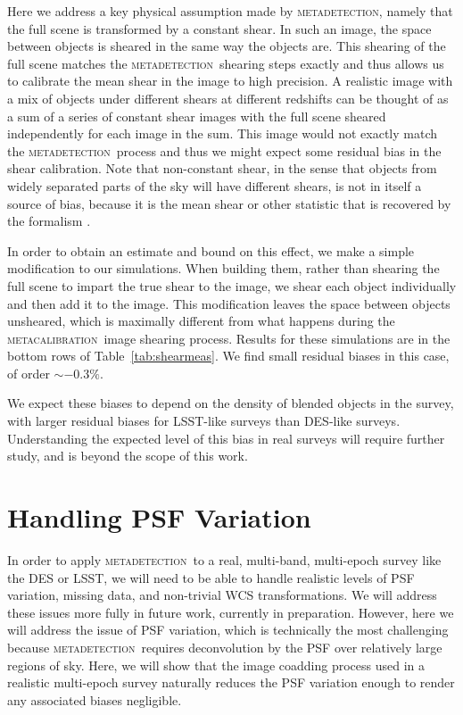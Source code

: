 \documentclass[fleqn,useAMS,usenatbib]{mnras}
\newcommand{\mcal}{\textsc{metacalibration}}
\newcommand{\mdet}{\textsc{metadetection}}
\begin{document}
Here we address a key physical assumption made by \mdet, namely that the full
scene is transformed by a constant shear. In such an image, the space between
objects is sheared in the same way the objects are. This shearing of the full
scene matches the \mdet\ shearing steps exactly and thus allows us to calibrate
the mean shear in the image to high precision. A realistic image with a mix of
objects under different shears at different redshifts can be thought of as a
sum of a series of constant shear images with the full scene sheared
independently for each image in the sum.  This image would not exactly match
the \mdet\ process and thus we might expect some residual bias in the shear
calibration.  Note that non-constant shear, in the sense that objects from
widely separated parts of the sky will have different shears, is not in itself
a source of bias, because it is the mean shear or other statistic that is
recovered by the formalism \citep{SheldonMcal2017}.

In order to obtain an estimate and bound on this effect, we make a simple
modification to our simulations. When building them, rather than shearing the
full scene to impart the true shear to the image, we shear each object
individually and then add it to the image. This modification leaves the space
between objects unsheared, which is maximally different from what happens
during the \mcal\ image shearing process. Results for these simulations are in
the bottom rows of Table~\ref{tab:shearmeas}. We find small residual biases in
this case, of order $\sim-0.3\%$.

We expect these biases to depend on the density of blended objects in the
survey, with larger residual biases for LSST-like surveys than DES-like
surveys.  Understanding the expected level of this bias in real surveys will
require further study, and is beyond the scope of this work.

\section{Handling PSF Variation}
\label{sec:psfvar}

In order to apply \mdet\ to a real, multi-band, multi-epoch survey like the DES
or LSST, we will need to be able to handle realistic levels of PSF variation,
missing data, and non-trivial WCS transformations. We will address these issues
more fully in future work, currently in preparation. However, here we will
address the issue of PSF variation, which is technically the most challenging
because \mdet\ requires deconvolution by the PSF over relatively large regions
of sky. Here, we will show that the image coadding process used in a realistic
multi-epoch survey naturally reduces the PSF variation enough to render any
associated biases negligible.
\end{document}
